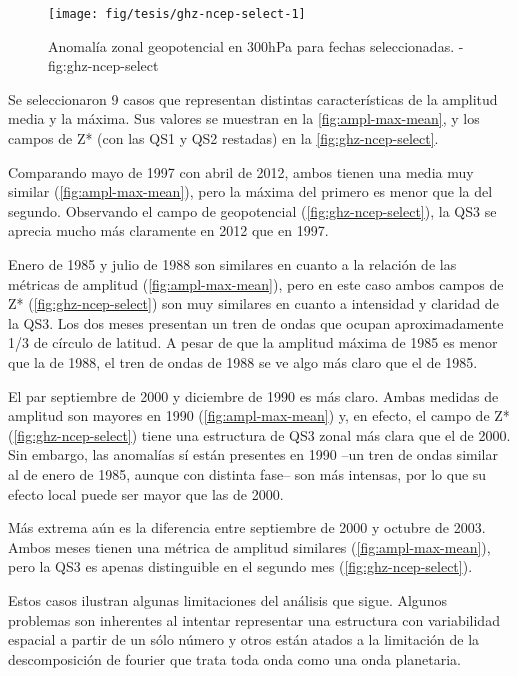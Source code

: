 \documentclass[spanish,a4paper]{book}
\begin{document}
\begin{figure*}
\texttt{[image: fig/tesis/ghz-ncep-select-1]} \caption{Anomalía zonal geopotencial en 300hPa para fechas seleccionadas. - fig:ghz-ncep-select}\label{fig:ghz-ncep-select}
\end{figure*}

Se seleccionaron 9 casos que representan distintas características de la
amplitud media y la máxima. Sus valores se muestran en la
\autoref{fig:ampl-max-mean}, y los campos de Z* (con las QS1 y QS2
restadas) en la \autoref{fig:ghz-ncep-select}.

Comparando mayo de 1997 con abril de 2012, ambos tienen una media muy
similar (\autoref{fig:ampl-max-mean}), pero la máxima del primero es
menor que la del segundo. Observando el campo de geopotencial
(\autoref{fig:ghz-ncep-select}), la QS3 se aprecia mucho más claramente
en 2012 que en 1997.

Enero de 1985 y julio de 1988 son similares en cuanto a la relación de
las métricas de amplitud (\autoref{fig:ampl-max-mean}), pero en este
caso ambos campos de Z* (\autoref{fig:ghz-ncep-select}) son muy
similares en cuanto a intensidad y claridad de la QS3. Los dos meses
presentan un tren de ondas que ocupan aproximadamente 1/3 de círculo de
latitud. A pesar de que la amplitud máxima de 1985 es menor que la de
1988, el tren de ondas de 1988 se ve algo más claro que el de 1985.

El par septiembre de 2000 y diciembre de 1990 es más claro. Ambas
medidas de amplitud son mayores en 1990 (\autoref{fig:ampl-max-mean}) y,
en efecto, el campo de Z* (\autoref{fig:ghz-ncep-select}) tiene una
estructura de QS3 zonal más clara que el de 2000. Sin embargo, las
anomalías sí están presentes en 1990 --un tren de ondas similar al de
enero de 1985, aunque con distinta fase-- son más intensas, por lo que
su efecto local puede ser mayor que las de 2000.

Más extrema aún es la diferencia entre septiembre de 2000 y octubre de
2003. Ambos meses tienen una métrica de amplitud similares
(\autoref{fig:ampl-max-mean}), pero la QS3 es apenas distinguible en el
segundo mes (\autoref{fig:ghz-ncep-select}).

Estos casos ilustran algunas limitaciones del análisis que sigue.
Algunos problemas son inherentes al intentar representar una estructura
con variabilidad espacial a partir de un sólo número y otros están
atados a la limitación de la descomposición de fourier que trata toda
onda como una onda
planetaria.
\end{document}
